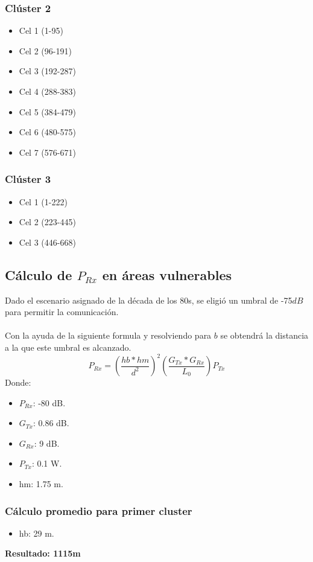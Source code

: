 \documentclass[11pt,letterpaper]{article}
\begin{document}
\subsubsection{Clúster 2}
\begin{itemize}
    \item Cel 1 (1-95)
    \item Cel 2 (96-191)
    \item Cel 3 (192-287)
    \item Cel 4 (288-383)
    \item Cel 5 (384-479)
    \item Cel 6 (480-575)
    \item Cel 7 (576-671)
\end{itemize}

\subsubsection{Clúster 3}
\begin{itemize}
    \item Cel 1 (1-222)
    \item Cel 2 (223-445)
    \item Cel 3 (446-668)
\end{itemize}

\newpage
\subsection{Cálculo de $P_{Rx}$ en áreas vulnerables}
Dado el escenario asignado de la década de los 80s, se eligió un umbral de -75$dB$ para 
permitir la comunicación.
\\ \\
Con la ayuda de la siguiente formula y resolviendo para $b$ se obtendrá la distancia a la 
que este umbral es alcanzado.
\begin{equation}
    P_{Rx}=(\frac{hb*hm}{d^2})^2 (\frac{G_{Tx}*G_{Rx}}{L_0}) P_{Tx}
\end{equation}
Donde:
\begin{itemize}
    \item $P_{Rx}$: -80 dB.
    \item $G_{Tx}$: 0.86 dB.
    \item $G_{Rx}$: 9 dB.
    \item $P_{Tx}$: 0.1 W.
    \item hm: 1.75 m.
\end{itemize}

\subsubsection{Cálculo promedio para primer cluster}
\begin{itemize}
    \item hb: 29 m.
\end{itemize}
\textbf{Resultado: 1115m}
\end{document}
